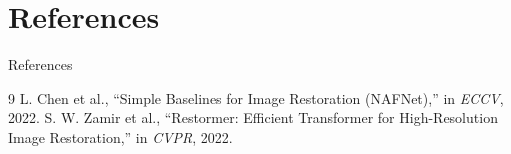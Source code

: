 \documentclass[aspectratio=169,xcolor=dvipsnames]{beamer}
\begin{document}
    \section{References}
    \begin{frame}[allowframebreaks]{References}
        \tiny
        \begin{thebibliography}{9}
            L. Chen et al., ``Simple Baselines for Image Restoration (NAFNet),'' in \textit{ECCV}, 2022.
            S. W. Zamir et al., ``Restormer: Efficient Transformer for High-Resolution Image Restoration,'' in \textit{CVPR}, 2022.
        \end{thebibliography}
    \end{frame}
\end{document}
